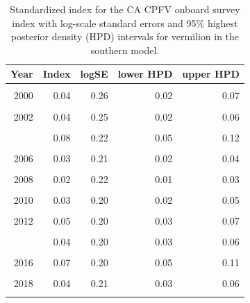 \documentclass[11pt,
  english,
]{article}
\begin{document}
\begin{table}

\caption{\label{tab:tab-index-cpfvonboard}Standardized index for the CA CPFV onboard survey index with log-scale standard errors and 95\% highest
       posterior density (HPD) intervals for vermilion in the southern model.}
\centering
\begin{tabular}[t]{rrrrr}
\toprule
Year & Index & logSE & lower HPD & upper HPD\\
\midrule
\cellcolor{gray!6}{1999} & \cellcolor{gray!6}{0.03} & \cellcolor{gray!6}{0.25} & \cellcolor{gray!6}{0.02} & \cellcolor{gray!6}{0.04}\\
2000 & 0.04 & 0.26 & 0.02 & 0.07\\
\cellcolor{gray!6}{2001} & \cellcolor{gray!6}{0.03} & \cellcolor{gray!6}{0.32} & \cellcolor{gray!6}{0.01} & \cellcolor{gray!6}{0.05}\\
2002 & 0.04 & 0.25 & 0.02 & 0.06\\
\cellcolor{gray!6}{2003} & \cellcolor{gray!6}{0.10} & \cellcolor{gray!6}{0.24} & \cellcolor{gray!6}{0.06} & \cellcolor{gray!6}{0.16}\\
\addlinespace
2004 & 0.08 & 0.22 & 0.05 & 0.12\\
\cellcolor{gray!6}{2005} & \cellcolor{gray!6}{0.04} & \cellcolor{gray!6}{0.21} & \cellcolor{gray!6}{0.03} & \cellcolor{gray!6}{0.06}\\
2006 & 0.03 & 0.21 & 0.02 & 0.04\\
\cellcolor{gray!6}{2007} & \cellcolor{gray!6}{0.04} & \cellcolor{gray!6}{0.21} & \cellcolor{gray!6}{0.02} & \cellcolor{gray!6}{0.05}\\
2008 & 0.02 & 0.22 & 0.01 & 0.03\\
\addlinespace
\cellcolor{gray!6}{2009} & \cellcolor{gray!6}{0.02} & \cellcolor{gray!6}{0.21} & \cellcolor{gray!6}{0.01} & \cellcolor{gray!6}{0.03}\\
2010 & 0.03 & 0.20 & 0.02 & 0.05\\
\cellcolor{gray!6}{2011} & \cellcolor{gray!6}{0.05} & \cellcolor{gray!6}{0.20} & \cellcolor{gray!6}{0.03} & \cellcolor{gray!6}{0.07}\\
2012 & 0.05 & 0.20 & 0.03 & 0.07\\
\cellcolor{gray!6}{2013} & \cellcolor{gray!6}{0.05} & \cellcolor{gray!6}{0.20} & \cellcolor{gray!6}{0.03} & \cellcolor{gray!6}{0.07}\\
\addlinespace
2014 & 0.04 & 0.20 & 0.03 & 0.06\\
\cellcolor{gray!6}{2015} & \cellcolor{gray!6}{0.07} & \cellcolor{gray!6}{0.20} & \cellcolor{gray!6}{0.05} & \cellcolor{gray!6}{0.11}\\
2016 & 0.07 & 0.20 & 0.05 & 0.11\\
\cellcolor{gray!6}{2017} & \cellcolor{gray!6}{0.05} & \cellcolor{gray!6}{0.21} & \cellcolor{gray!6}{0.03} & \cellcolor{gray!6}{0.07}\\
2018 & 0.04 & 0.21 & 0.03 & 0.06\\
\addlinespace
\cellcolor{gray!6}{2019} & \cellcolor{gray!6}{0.07} & \cellcolor{gray!6}{0.21} & \cellcolor{gray!6}{0.05} & \cellcolor{gray!6}{0.11}\\
\bottomrule
\end{tabular}
\end{table}
\end{document}
